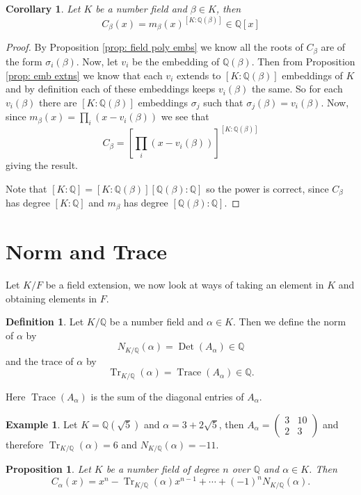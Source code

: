 \documentclass[11pt,a4paper]{report}
\theoremstyle{plain}
\newtheorem{corollary}[subsection]{Corollary}
\newtheorem{prop}[subsection]{Proposition}
\theoremstyle{definition}
\newtheorem{definition}[subsection]{Definition}
\newtheorem{exmp}[subsection]{Example}
\theoremstyle{definition}
\newcommand{\Tr}{\operatorname{Tr}}
\def\QQ{\mathbb{Q}}
\def \a{\alpha}
\def \v {v}
\DeclareMathOperator{\Det}{Det}
\DeclareMathOperator{\Trace}{Trace}
\newcommand{\smallmatrd}[4]{\left(\begin{smallmatrix}#1&#2\\#3&#4\end{smallmatrix}\right)}
\begin{document}
	\begin{corollary}\label{cor: field to min pol}
		Let $K$ be a number field and $\beta \in K$, then \[C_\beta(x)=m_\beta(x)^{[K:\QQ(\beta)]} \in \QQ[x]\]
	\end{corollary}
	
	\begin{proof}
		By Proposition \ref{prop: field poly embs} we know all the roots of $C_\beta$ are of the form $\sigma_i(\beta)$. Now, let $\v_i$ be the embedding of $\QQ(\beta)$. Then  from Proposition \ref{prop: emb extns} we know that each $\v_i$ extends to $[K:\QQ(\beta)]$ embeddings of $K$ and by definition each of these embeddings keeps $\v_i(\beta)$ the same. So for each $\v_i(\beta)$ there are $[K:\QQ(\beta)]$ embeddings $\sigma_j$ such that $\sigma_j(\beta)=\v_i(\beta)$. Now, since $m_\beta(x)=\prod_i (x-\v_i(\beta))$ we see that \[C_\beta= \left [\prod_i (x-\v_i(\beta))\right ]^{[K:\QQ(\beta)]}\] giving the result.
		
		
		
		
		Note that $[K:\QQ]=[K:\QQ(\beta)][\QQ(\beta):\QQ]$ so the power is correct, since $C_\beta$ has degree $[K:\QQ]$ and $m_\beta$ has degree $[\QQ(\beta):\QQ]$. 
	\end{proof}
	
	\section{Norm and Trace}
	
	Let $K/F$ be a field extension, we now look at ways of taking an element in $K$ and obtaining elements in $F$.
	
	\begin{definition}\label{definition: norm and trace}
		Let $K/\QQ$ be a number field and $\a \in K$. Then we define the norm of $\a$ by \[N_{K/\QQ}(\a)= \Det(A_\a) \in \QQ\] and the trace of $\a$ by \[\Tr_{K/\QQ}(\a)=\Trace(A_\a) \in \QQ.\]
		
		Here $\Trace(A_\a)$ is the sum of the diagonal entries of $A_\a$.
	\end{definition}
	
	\begin{exmp}
		Let $K=\QQ(\sqrt{5})$ and $\a=3+2\sqrt{5}$, then $A_\a=\smallmatrd{3}{10}{2}{3}$ and therefore $\Tr_{K/\QQ}(\a)=6$ and $N_{K/\QQ}(\a)=-11$.
	\end{exmp}
	
	\begin{prop}\label{prop: field pol relation to norm and trace}
		Let $K$ be a number field of degree $n$ over $\QQ$ and $\a \in K$. Then  \[C_\a(x)=x^n-\Tr_{K/\QQ}(\a)x^{n-1} +\cdots+(-1)^n N_{K/\QQ}(\a). \]
	\end{prop}
	
\end{document}
